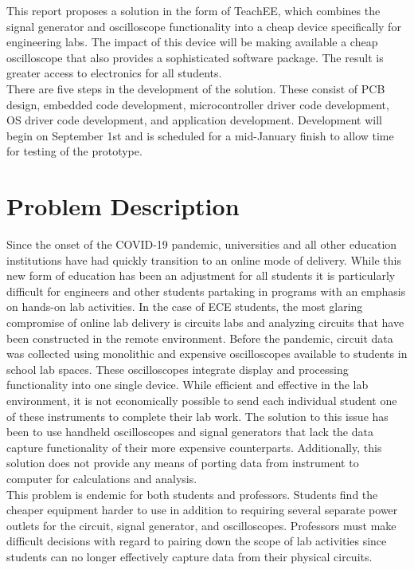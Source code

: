 \documentclass[letterpaper,12pt]{article}
\begin{document}
\noindent
This report proposes a solution in the form of TeachEE, which combines the
signal generator and oscilloscope functionality into a cheap device specifically
for engineering labs. The impact of this device will be making available a cheap
oscilloscope that also provides a sophisticated software package. The result is
greater access to electronics for all students.\\

\noindent
There are five steps in the development of the solution. These consist of PCB
design, embedded code development, microcontroller driver code development, OS
driver code development, and application development. Development will begin on
September 1st and is scheduled for a mid-January finish to allow time for
testing of the prototype.

\newpage

\tableofcontents
\listoffigures
\listoftables
\newpage

\section{Problem Description} \label{sec:prob-desc} %
Since the onset of the COVID-19 pandemic, universities and all other education
institutions have had quickly transition to an online mode of delivery. While
this new form of education has been an adjustment for all students it is
particularly difficult for engineers and other students partaking in programs
with an emphasis on hands-on lab activities. In the case of ECE students, the
most glaring compromise of online lab delivery is circuits labs and analyzing
circuits that have been constructed in the remote environment. Before the
pandemic, circuit data was collected using monolithic and expensive
oscilloscopes available to students in school lab spaces. These oscilloscopes
integrate display and processing functionality into one single device. While
efficient and effective in the lab environment, it is not economically possible
to send each individual student one of these instruments to complete their lab
work. The solution to this issue has been to use handheld oscilloscopes and
signal generators that lack the data capture functionality of their more
expensive counterparts. Additionally, this solution does not provide any means
of porting data from instrument to computer for calculations and analysis.\\

\noindent
This problem is endemic for both students and professors. Students find the
cheaper equipment harder to use in addition to requiring several separate power
outlets for the circuit, signal generator, and oscilloscopes. Professors must
make difficult decisions with regard to pairing down the scope of lab activities
since students can no longer effectively capture data from their physical
circuits.
\end{document}

